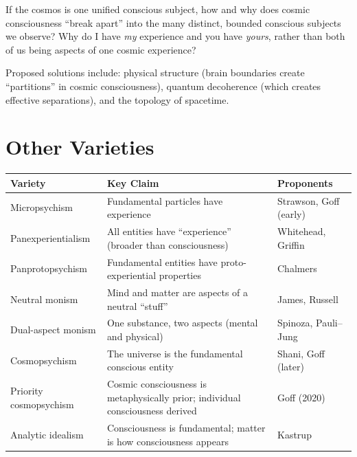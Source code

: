 \documentclass[11pt,a4paper]{report}
\begin{document}
\begin{objbox}
If the cosmos is one unified conscious subject, how and why does cosmic consciousness ``break apart'' into the many distinct, bounded conscious subjects we observe? Why do I have \emph{my} experience and you have \emph{yours}, rather than both of us being aspects of one cosmic experience?
\end{objbox}

Proposed solutions include: physical structure (brain boundaries create ``partitions'' in cosmic consciousness), quantum decoherence (which creates effective separations), and the topology of spacetime.

\section{Other Varieties}

\begin{center}
\renewcommand{\arraystretch}{1.3}
\begin{tabular}{>{\raggedright}p{3.5cm} >{\raggedright}p{4cm} >{\raggedright\arraybackslash}p{5.5cm}}
  \toprule
  \textbf{Variety} & \textbf{Key Claim} & \textbf{Proponents} \\
  \midrule
  Micropsychism & Fundamental particles have experience & Strawson, Goff (early) \\
  Panexperientialism & All entities have ``experience'' (broader than consciousness) & Whitehead, Griffin \\
  Panprotopsychism & Fundamental entities have proto-experiential properties & Chalmers \\
  Neutral monism & Mind and matter are aspects of a neutral ``stuff'' & James, Russell \\
  Dual-aspect monism & One substance, two aspects (mental and physical) & Spinoza, Pauli--Jung \\
  Cosmopsychism & The universe is the fundamental conscious entity & Shani, Goff (later) \\
  Priority cosmopsychism & Cosmic consciousness is metaphysically prior; individual consciousness derived & Goff (2020) \\
  Analytic idealism & Consciousness is fundamental; matter is how consciousness appears & Kastrup \\
  \bottomrule
\end{tabular}
\end{center}


\end{document}
